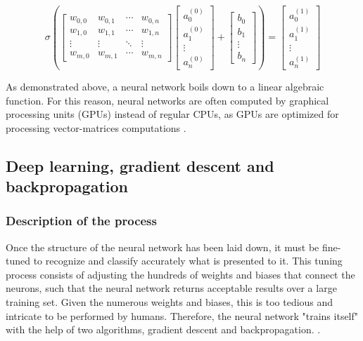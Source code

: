\documentclass[12pt,a4paper,notitlepage]{article}
\begin{document}
\begin{displaymath}
	\sigma
	\left(
	\begin{bmatrix}
		w_{0,0} & w_{0,1} & \cdots & w_{0,n}\\
		w_{1,0} & w_{1,1} & \cdots & w_{1,n}\\
		\vdots & \vdots & \ddots & \vdots\\
		w_{m,0} & w_{m,1} & \cdots & w_{m,n}
	\end{bmatrix}
	\begin{bmatrix}
		a_{0}^{(0)}\\
		a_{1}^{(0)}\\
		\vdots\\
		a_{n}^{(0)}
	\end{bmatrix}
	+
	\begin{bmatrix}
		b_{0}\\
		b_{1}\\
		\vdots\\
		b_{n}
	\end{bmatrix}
	\right)
	=
	\begin{bmatrix}
		a_{0}^{(1)}\\
		a_{1}^{(1)}\\
		\vdots\\
		a_{n}^{(1)}
	\end{bmatrix}
\end{displaymath}

As demonstrated above, a neural network boils down to a linear algebraic function. For this reason, neural networks are often computed by graphical processing units (GPUs) instead of regular CPUs, as GPUs are optimized for processing vector-matrices computations \cite{salter_cart_2021}.

\subsection{Deep learning, gradient descent and backpropagation}\label{deep-learning}
\subsubsection{Description of the process}
Once the structure of the neural network has been laid down, it must be fine-tuned to recognize and classify accurately what is presented to it. This tuning process consists of adjusting the hundreds of weights and biases that connect the neurons, such that the neural network returns acceptable results over a large training set. Given the numerous weights and biases, this is too tedious and intricate to be performed by humans. Therefore, the neural network "trains itself" with the help of two algorithms, gradient descent and backpropagation. \cite{ibm_cloud_education_what_2020}.
\end{document}
